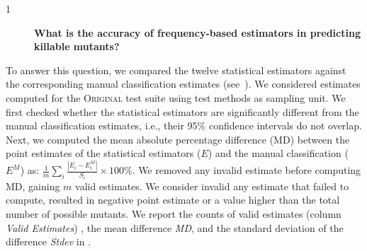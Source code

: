 \documentclass[sigconf]{acmart}
\newcommand{\estimatorCount}{twelve\xspace}
\newcommand{\original}{\textsc{Original}\xspace}
\newcommand{\RQA}{\textcircled{1}\xspace}
\newcommand{\RQAx}{%
\begin{description}\item[\RQA]\textbf{What is the accuracy of frequency-based estimators in predicting killable mutants?}\end{description}}
\begin{document}
\begin{table}[h]
    \caption{Comparison of \emph{mean difference (MD)} between method estimators across test subjects---\original test suites}
    \label{tbl:estoriginal}
\end{table}
\RQAx
To answer this question, we compared 
the \estimatorCount statistical estimators against the corresponding manual classification estimates (see~).
We considered estimates computed for the \original test suite using test methods as sampling unit.
We first checked whether the statistical estimators are significantly different
from the manual classification estimates, i.e.,  their 95\% confidence intervals do not overlap.
Next, we computed the
mean absolute percentage difference (MD) between the point estimates of the
statistical estimators ($E$) and the manual classification ($E^M$) as: $\frac{1}{m}\sum_i{\frac{|E_i - E^M_i|}{S_i}}\times100\%$.
We removed any invalid estimate before computing MD, gaining $m$ valid estimates.
We consider invalid any estimate that failed to compute, resulted in negative point estimate or a value higher than the total number of possible mutants.
We report the counts of valid estimates (column \emph{Valid Estimates})
, the mean difference \emph{MD}, and the standard deviation of the difference \emph{Stdev}
in .
\end{document}
